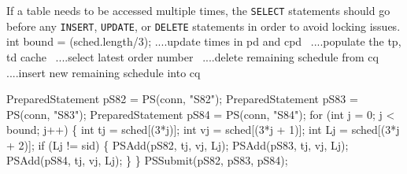 \documentclass{article}
\def\nwendcode{\endtrivlist \endgroup}      %
\let\nwdocspar=\par
\theoremstyle{definition}                   %
\begin{document}
If a table needs to be accessed multiple times, the {\tt{}SELECT} statements
should go before any {\tt{}INSERT}, {\tt{}UPDATE}, or {\tt{}DELETE} statements in
order to avoid locking issues.
\nwenddocs{}\endmoddef{}
int bound = (sched.length/3);
\LA{}....update times in pd and cpd~{\nwtagstyle{}}\RA{}
\LA{}....populate the tp, td cache~{\nwtagstyle{}}\RA{}
\LA{}....select latest order number~{\nwtagstyle{}}\RA{}
\LA{}....delete remaining schedule from cq~{\nwtagstyle{}}\RA{}
\LA{}....insert new remaining schedule into cq~{\nwtagstyle{}}\RA{}
\nwendcode{}\nwdocspar
\nwenddocs{}\endmoddef{}
PreparedStatement pS82 = PS(conn, "S82");
PreparedStatement pS83 = PS(conn, "S83");
PreparedStatement pS84 = PS(conn, "S84");
for (int j = 0; j < bound; j++) \{
  int tj = sched[(3*j)];
  int vj = sched[(3*j + 1)];
  int Lj = sched[(3*j + 2)];
  if (Lj != sid) \{
    PSAdd(pS82, tj, vj, Lj);
    PSAdd(pS83, tj, vj, Lj);
    PSAdd(pS84, tj, vj, Lj);
  \}
\}
PSSubmit(pS82, pS83, pS84);
\nwendcode{}\nwdocspar
\nwenddocs{}\endmoddef{}
\end{document}

